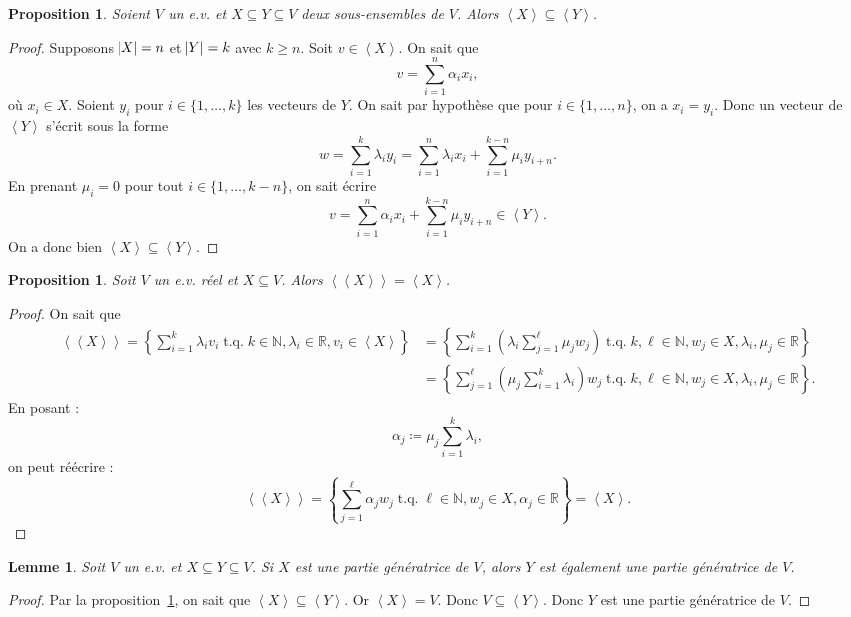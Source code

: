 \documentclass{article}
\DeclareMathOperator{\tq}{\text{ t.q. }}
\newcommand{\N}{\mathbb N}
\newcommand{\R}{\mathbb R}
\newcommand{\eng}[1]{\left\langle#1\right\rangle}
\newtheorem{prp}[thm]{Proposition}
\newtheorem{lem}[thm]{Lemme}
\theoremstyle{definition}
\theoremstyle{remark}
\begin{document}
		\begin{prp}\label{engXDansEngY} Soient $V$ un e.v. et $X \subseteq Y \subseteq V$ deux sous-ensembles de $V$. Alors $\eng X \subseteq \eng Y$. \end{prp}

		\begin{proof} Supposons $\abs X = n$ et $\abs Y = k$ avec $k \geq n$. Soit $v \in \eng X$. On sait que \[v = \sum_{i=1}^n\alpha_ix_i,\] où $x_i \in X$.
		Soient $y_i$ pour $i \in \{1, \ldots, k\}$ les vecteurs de $Y$. On sait par hypothèse que pour $i \in \{1, \ldots, n\}$, on a $x_i = y_i$. Donc un vecteur de $\eng Y$
		s'écrit sous la forme \[w = \sum_{i=1}^k\lambda_iy_i = \sum_{i=1}^n\lambda_ix_i + \sum_{i=1}^{k-n}\mu_iy_{i+n}.\] En prenant $\mu_i = 0$ pour tout
		$i \in \{1, \ldots, k-n\}$, on sait écrire \[v = \sum_{i=1}^n\alpha_ix_i + \sum_{i=1}^{k-n}\mu_iy_{i+n} \in \eng Y.\] On a donc bien $\eng X \subseteq \eng Y$.
		\end{proof}

		\begin{prp} Soit $V$ un e.v. réel et $X \subseteq V$. Alors $\eng {\eng X} = \eng X$. \end{prp}

		\begin{proof} On sait que
		\begin{align*}
			\eng {\eng X} = \left\{\sum_{i=1}^k\lambda_iv_i \tq k \in \N, \lambda_i \in \R, v_i \in \eng X\right\}
			&= \left\{\sum_{i=1}^k\left(\lambda_i\sum_{j=1}^\ell\mu_jw_j\right) \tq k, \ell \in \N, w_j \in X, \lambda_i, \mu_j \in \R\right\} \\
			&= \left\{\sum_{j=1}^\ell\left(\mu_j\sum_{i=1}^k\lambda_i\right)w_j \tq k, \ell \in \N, w_j \in X, \lambda_i, \mu_j \in \R\right\}.
		\end{align*}
		En posant : \[\alpha_j \coloneqq \mu_j\sum_{i=1}^k\lambda_i,\] on peut réécrire :
		\[\eng {\eng X} = \left\{\sum_{j=1}^\ell\alpha_jw_j \tq \ell \in \N, w_j \in X, \alpha_j \in \R\right\} = \eng X.\] \end{proof}

		\begin{lem} Soit $V$ un e.v. et $X \subseteq Y \subseteq V$. Si $X$ est une partie génératrice de $V$, alors $Y$ est également une partie génératrice de $V$. \end{lem}

		\begin{proof} Par la proposition~\ref{engXDansEngY}, on sait que $\eng X \subseteq \eng Y$. Or $\eng X = V$. Donc $V \subseteq \eng Y$. Donc $Y$ est une partie
		génératrice de $V$. \end{proof}
\end{document}
